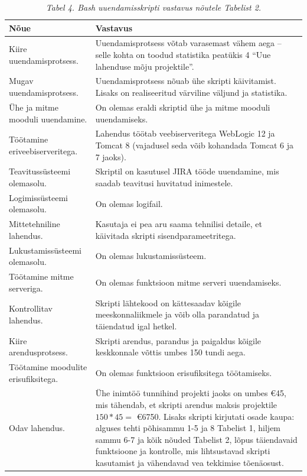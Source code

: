 \documentclass[12pt]{article}
\begin{document}
   \begin{table}[H]
    \caption*{\textit{Tabel 4. Bash uuendamisskripti vastavus nõutele Tabelist 2.}}
    
    \begin{tabular}{|p{3cm}|p{11cm}|}
      \hline
      \textbf{Nõue} & \textbf{Vastavus}\\
      \hline
      Kiire uuendamisprotsess. & Uuendamisprotsess võtab varasemast vähem aega \--- selle kohta on toodud statistika peatükis 4 ``Uue lahenduse mõju projektile''.\\
      \hline
      Mugav uuendamisprotsess. & Uuendamisprotsess nõuab ühe skripti käivitamist. Lisaks on realiseeritud värviline väljund ja statistika.\\
      \hline
      Ühe ja mitme mooduli uuendamine. & On olemas eraldi skriptid ühe ja mitme mooduli uuendamiseks.\\
      \hline
      Töötamine eriveebiserveritega. & Lahendus töötab veebiserveritega WebLogic 12 ja Tomcat 8 (vajadusel seda võib kohandada Tomcat 6 ja 7 jaoks).\\
      \hline
      Teavitussüsteemi olemasolu. & Skriptil on kasutusel JIRA tööde uuendamine, mis saadab teavitusi huvitatud inimestele.\\
      \hline
      Logimissüsteemi olemasolu. & On olemas logifail.\\
      \hline
      Mittetehniline lahendus. & Kasutaja ei pea aru saama tehnilisi detaile, et käivitada skripti sisendparameetritega.\\
      \hline
      Lukustamis\-süsteemi olemasolu. & On olemas lukustamissüsteem.\\
      \hline
      Töötamine mitme serveriga. & On olemas funktsioon mitme serveri uuendamiseks.\\
      \hline
      Kontrollitav lahendus. & Skripti lähtekood on kättesaadav kõigile meeskonnaliikmele ja võib olla parandatud ja täiendatud igal hetkel.\\
      \hline
      Kiire arendusprotsess. & Skripti arendus, parandus ja paigaldus kõigile keskkonnale võttis umbes 150 tundi aega.\\
      \hline
      Töötamine moodulite erisufiksitega. & On olemas funktsioon erisufiksitega töötamiseks.\\
      \hline
      Odav lahendus. & Ühe inimtöö tunnihind projekti jaoks on umbes \euro 45, mis tähendab, et skripti arendus maksis projektile $150 * 45 = $ \euro 6750. Lisaks skripti kirjutati osade kaupa: alguses tehti põhisammu 1-5 ja 8 Tabelist 1, hiljem sammu 6-7 ja kõik nõuded Tabelist 2, lõpus täiendavaid funktsioone ja kontrolle, mis lihtsustavad skripti kasutamist ja vähendavad vea tekkimise tõenäosust.\\
      \hline
    \end{tabular}
  \end{table}
  
\end{document}
